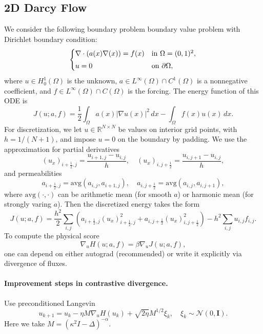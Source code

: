\documentclass[11pt]{article}
\newcommand{\bbR}{\mathbb{R}}
\begin{document}
\subsection{2D Darcy Flow}
We consider the following boundary problem boundary value problem with Dirichlet boundary condition:
\begin{equation*}
\begin{cases}
    \nabla\cdot\left(a(x)\nabla(x)\right)=f(x) &\text{in}\ \Omega=(0,1)^2,\vspace{0.1cm}\\
    u=0 &\text{on}\ \partial\Omega,
\end{cases}
\end{equation*}
where $u\in H_0^1(\Omega)$ is the unknown, $a\in L^\infty(\Omega)\cap C^1(\Omega)$ is a nonnegative coefficient, and $f\in L^\infty(\Omega)\cap C(\Omega)$ is the forcing. The energy function of this ODE is
\begin{equation*}
J(u;a,f)=\frac{1}{2}\int_\Omega a(x)\left\vert\nabla u(x)\right\vert^2\,dx-\int_\Omega f(x)u(x)\,dx.
\end{equation*}
For discretization, we let $u\in\bbR^{N\times N}$ be values on interior grid points, with $h=1/(N+1)$, and impose $u=0$ on the boundary by padding. We use the approximation for partial derivatives
\begin{equation*}
(u_x)_{i+\frac{1}{2},j}=\frac{u_{i+1,j}-u_{i,j}}{h},\quad (u_x)_{i,j+\frac{1}{2}}=\frac{u_{i,j+1}-u_{i,j}}{h},
\end{equation*}
and permeabilities
\begin{equation*}
    a_{i+\frac{1}{2},j}=\mathrm{avg}(a_{i,j},a_{i+1,j}),\quad a_{i,j+\frac{1}{2}}=\mathrm{avg}(a_{i,j},a_{i,j+1}),
\end{equation*}
where $\mathrm{avg}(\cdot,\cdot)$ can be arithmetic mean (for smooth $a$) or harmonic mean (for strongly varing $a$). Then the discretized energy takes the form
\begin{equation*}
    J(u;a,f)=\frac{h^2}{2}\sum_{i,j}\left(a_{i+\frac{1}{2},j}(u_x)_{i+\frac{1}{2},j}^2+a_{i,j+\frac{1}{2}}(u_x)_{i,j+\frac{1}{2}}^2\right)-h^2\sum_{i,j}u_{i,j}f_{i,j}.
\end{equation*}
To compute the physical score
\begin{equation*}
    \nabla_u H(u;a,f)=\beta\nabla_u J(u;a,f),
\end{equation*}
one can depend on either autograd (recommended) or write it explicitly via divergence of fluxes.

\paragraph{Improvement steps in contrastive divergence.} Use preconditioned Langevin
\begin{equation*}
    u_{k+1}=u_k-\eta M\nabla_u H(u_k)+\sqrt{2\eta}M^{1/2}\xi_k,\quad\xi_k\sim\mathcal{N}(0,\mathbf{I}).
\end{equation*}
Here we take $M=(\kappa^2I-\Delta)^{-\alpha}$.
\end{document}
